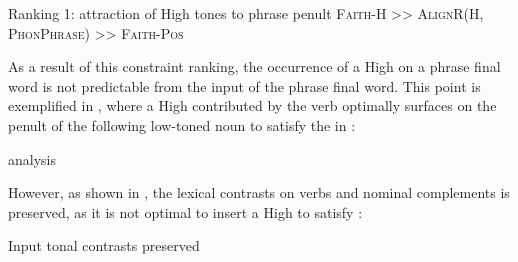 \documentclass[output=paper
,newtxmath
,modfonts
,nonflat]{langsci/langscibook}
\begin{document}
\ea\label{ex:downing:17}  Ranking 1:  attraction of High tones to phrase penult
\sn
\textsc{Faith-H >> AlignR(H, PhonPhrase}) \textsc{>> Faith-Pos}
\z


As a result of this constraint ranking, the occurrence of a High  on a phrase final word is not predictable from the input  of the phrase final word. This point is exemplified in , where a High  contributed by the verb optimally surfaces on the penult of the following low-toned noun to satisfy the  in :

\begin{comment}
\ea%
    \label{bkm:Ref320194713}
    \langinfo{lg}{fam}{src}\\
    \gll \\  
        \\
    \glt
    \z
\end{comment}
\ea\label{ex:downing:18} analysis
\z

However, as shown in , the lexical  contrasts on verbs and nominal complements is preserved, as it is not optimal to insert a High  to satisfy :
\begin{comment}
\ea%
    \label{bkm:Ref336871824}
    \langinfo{lg}{fam}{src}\\
    \gll \\  
        \\
    \glt
    \z
\end{comment}
\ea\label{ex:downing:19} Input tonal contrasts preserved 
\z
\end{document}
